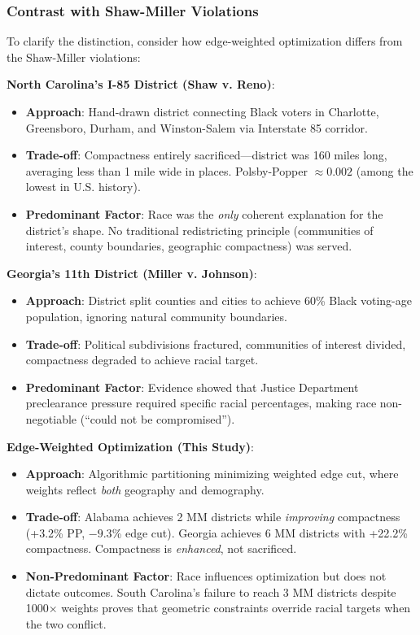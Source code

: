 \subsubsection{Contrast with Shaw-Miller Violations}

To clarify the distinction, consider how edge-weighted optimization differs from the Shaw-Miller violations:

\textbf{North Carolina's I-85 District (Shaw v. Reno)}:
\begin{itemize}
    \item \textbf{Approach}: Hand-drawn district connecting Black voters in Charlotte, Greensboro, Durham, and Winston-Salem via Interstate 85 corridor.
    \item \textbf{Trade-off}: Compactness entirely sacrificed---district was 160 miles long, averaging less than 1 mile wide in places. Polsby-Popper $\approx 0.002$ (among the lowest in U.S. history).
    \item \textbf{Predominant Factor}: Race was the \emph{only} coherent explanation for the district's shape. No traditional redistricting principle (communities of interest, county boundaries, geographic compactness) was served.
\end{itemize}

\textbf{Georgia's 11th District (Miller v. Johnson)}:
\begin{itemize}
    \item \textbf{Approach}: District split counties and cities to achieve 60\% Black voting-age population, ignoring natural community boundaries.
    \item \textbf{Trade-off}: Political subdivisions fractured, communities of interest divided, compactness degraded to achieve racial target.
    \item \textbf{Predominant Factor}: Evidence showed that Justice Department preclearance pressure required specific racial percentages, making race non-negotiable (``could not be compromised'').
\end{itemize}

\textbf{Edge-Weighted Optimization (This Study)}:
\begin{itemize}
    \item \textbf{Approach}: Algorithmic partitioning minimizing weighted edge cut, where weights reflect \emph{both} geography and demography.
    \item \textbf{Trade-off}: Alabama achieves 2 MM districts while \emph{improving} compactness (+3.2\% PP, $-9.3$\% edge cut). Georgia achieves 6 MM districts with +22.2\% compactness. Compactness is \emph{enhanced}, not sacrificed.
    \item \textbf{Non-Predominant Factor}: Race influences optimization but does not dictate outcomes. South Carolina's failure to reach 3 MM districts despite 1000× weights proves that geometric constraints override racial targets when the two conflict.
\end{itemize}

